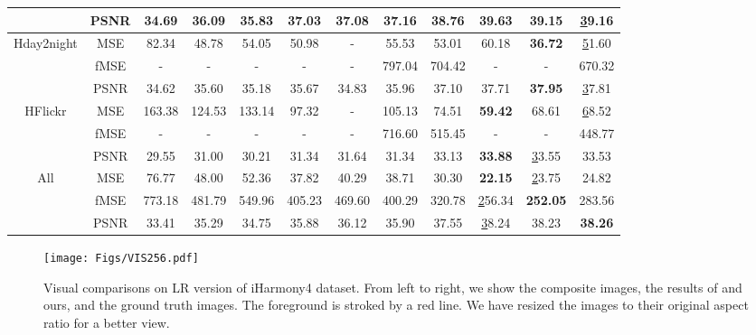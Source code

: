\documentclass[10pt,journal,twocolumn,twoside]{IEEEtran}
\begin{document}
\begin{table*}
{\begin{tabular}{@{}c|c|ccccccccc|c@{}}
                            & PSNR   & 34.69  & 36.09  & 35.83  & 37.03   & 37.08   & 37.16     & 38.76  & \textbf{39.63} & 39.15           & {\ul 39.16}    \\ \midrule
\multirow{3}{*}{Hday2night} & MSE    & 82.34  & 48.78  & 54.05  & 50.98   & -       & 55.53     & 53.01  & 60.18          & \textbf{36.72}  & {\ul 51.60}     \\
                            & fMSE   & -      & -      & -      & -       & -       & 797.04    & 704.42 & -              & -               & 670.32         \\
                            & PSNR   & 34.62  & 35.60   & 35.18  & 35.67   & 34.83   & 35.96     & 37.10   & 37.71          & \textbf{37.95}  & {\ul 37.81}    \\ \midrule
\multirow{3}{*}{HFlickr}    & MSE    & 163.38 & 124.53 & 133.14 & 97.32   & -       & 105.13    & 74.51  & \textbf{59.42} & 68.61           & {\ul 68.52}    \\
                            & fMSE   & -      & -      & -      & -       & -       & 716.60     & 515.45 & -              & -               & 448.77         \\
                            & PSNR   & 29.55  & 31.00     & 30.21  & 31.34   & 31.64   & 31.34     & 33.13  & \textbf{33.88} & {\ul 33.55}     & 33.53          \\ \midrule
\multirow{3}{*}{All}        & MSE    & 76.77  & 48.00     & 52.36  & 37.82   & 40.29   & 38.71     & 30.30   & \textbf{22.15} & {\ul 23.75}     & 24.82          \\
                            & fMSE   & 773.18 & 481.79 & 549.96 & 405.23  & 469.60   & 400.29    & 320.78 & {\ul 256.34}   & \textbf{252.05} & 283.56         \\
                            & PSNR   & 33.41  & 35.29  & 34.75  & 35.88   & 36.12   & 35.90      & 37.55  & {\ul 38.24}    & 38.23           & \textbf{38.26} \\ \bottomrule
\end{tabular}}
\end{table*}

\begin{figure}[t]
  \centering
   \texttt{[image: Figs/VIS256.pdf]}
   \caption{Visual comparisons on  LR version of iHarmony4 dataset. From left to right, we show the composite images, the results of \cite{cong2020dovenet, ling2021region, guo2021intrinsic, guo2021image} and ours, and the ground truth images. The foreground is stroked by a red line. We have resized the images to their original aspect ratio for a better view.}
   \label{fig:VIS256}
\end{figure}
\end{document}
